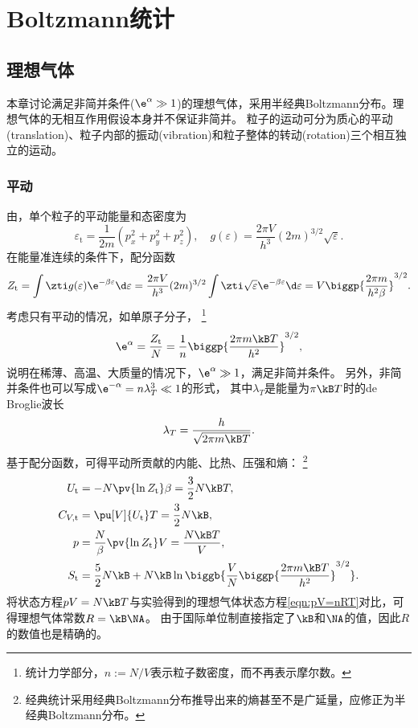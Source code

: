 \newcommand*{\tl}{\mathrm t}  %
\newcommand*{\rt}{\mathrm r}  %
\newcommand*{\vb}{\mathrm v}  %

\chapter{Boltzmann统计}

\section{理想气体}
\label{sec:ideal gas}

本章讨论满足非简并条件($\e^\alpha\gg 1$)的理想气体，采用半经典Boltzmann分布。理想气体的无相互作用假设本身并不保证非简并。
粒子的运动可分为质心的平动(translation)、粒子内部的振动(vibration)和粒子整体的转动(rotation)三个相互独立的运动。

\subsection{平动}
\label{ssec:translation}

由，单个粒子的平动能量和态密度为
\[
	\varepsilon_\tl=\frac1{2m}(p_x^2+p_y^2+p_z^2),\quad g(\varepsilon)=\frac{2\pi V}{h^3}(2m)^{3/2}\sqrt\varepsilon.
\]
在能量准连续的条件下，配分函数
\begin{equation}
	Z_\tl=\int\zti g(\varepsilon)\e^{-\beta\varepsilon}\d\varepsilon=\frac{2\pi V}{h^3}(2m)^{3/2}\int\zti\sqrt\varepsilon\e^{-\beta\varepsilon}\d\varepsilon=V\biggp{\frac{2\pi m}{h^2\beta}}^{3/2}.
\end{equation}
考虑只有平动的情况，如单原子分子，
\footnote{统计力学部分，$n:=N/V$表示粒子数密度，而不再表示摩尔数。}
\[
	\e^{\alpha}=\frac{Z_\tl}N=\frac1n\biggp{\frac{2\pi m\kB T}{h^2}}^{3/2},
\]
说明在稀薄、高温、大质量的情况下，$\e^\alpha\gg 1$，满足非简并条件。
另外，非简并条件也可以写成$\e^{-\alpha}=n\lambda_T^3\ll 1$的形式，
其中$\lambda_T$是能量为$\pi\kB T$时的de Broglie波长
\begin{equation}
	\label{eqn:de Broglie wavelength}
	\lambda_T=\frac{h}{\sqrt{2\pi m\kB T}}.
\end{equation}
基于配分函数，可得平动所贡献的内能、比热、压强和熵：
\footnote{经典统计采用经典Boltzmann分布推导出来的熵甚至不是广延量，应修正为半经典Boltzmann分布。}
\begin{subequations}
	\begin{align}
		U_\tl&=-N\pv{\ln Z_\tl}\beta=\frac32N\kB T,\\
		C_{V,\tl}&=\pu[V]{U_\tl}T=\frac32N\kB,\\
		p&=\frac N\beta\pv{\ln Z_\tl}V=\frac{N\kB T}V,\\
		S_\tl
		&=\frac52N\kB+N\kB\ln\biggb{\frac VN\biggp{\frac{2\pi m\kB T}{h^2}}^{3/2}}.
	\end{align}
\end{subequations}
将状态方程$pV=N\kB T$与实验得到的理想气体状态方程\eqref{eqn:pV=nRT}对比，可得理想气体常数$R=\kB\NA$。
由于国际单位制直接指定了$\kB$和$\NA$的值，因此$R$的数值也是精确的。

